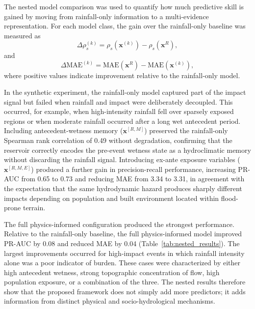 \documentclass[pdflatex,sn-mathphys-ay]{sn-jnl}
\theoremstyle{thmstyleone}
\theoremstyle{thmstylethree}
\theoremstyle{thmstyletwo}
\begin{document}
The nested model comparison was used to quantify how much predictive
skill is gained by moving from rainfall-only information to a
multi-evidence representation.  For each model class, the gain over the
rainfall-only baseline was measured as
\begin{equation}
  \Delta \rho_s^{(k)}
  =
  \rho_s
  \left(
    \mathbf{x}^{(k)}
  \right)
  -
  \rho_s
  \left(
    \mathbf{x}^{R}
  \right),
  \label{eq:delta_spearman}
\end{equation}
and
\begin{equation}
  \Delta \mathrm{MAE}^{(k)}
  =
  \mathrm{MAE}
  \left(
    \mathbf{x}^{R}
  \right)
  -
  \mathrm{MAE}
  \left(
    \mathbf{x}^{(k)}
  \right),
  \label{eq:delta_mae}
\end{equation}
where positive values indicate improvement relative to the
rainfall-only model.

In the synthetic experiment, the rainfall-only model captured part of
the impact signal but failed when rainfall and impact were deliberately
decoupled.  This occurred, for example, when high-intensity rainfall
fell over sparsely exposed regions or when moderate rainfall occurred
after a long wet antecedent period.  Including antecedent-wetness
memory ($\mathbf{x}^{[R,M]}$) preserved the rainfall-only Spearman
rank correlation of 0.49 without degradation, confirming that the
reservoir correctly encodes the pre-event wetness state as a
hydroclimatic memory without discarding the rainfall signal.
Introducing ex-ante exposure variables ($\mathbf{x}^{[R,M,E]}$)
produced a further gain in precision-recall performance, increasing
PR-AUC from 0.65 to 0.73 and reducing MAE from 3.34 to 3.31, in
agreement with the expectation that the same hydrodynamic hazard
produces sharply different impacts depending on population and
built environment located within flood-prone terrain.

The full physics-informed configuration produced the strongest
performance.  Relative to the rainfall-only baseline, the full
physics-informed model improved PR-AUC by 0.08 and reduced MAE by
0.04 (Table~\ref{tab:nested_results}).  The largest improvements
occurred for high-impact events in which rainfall intensity alone was a
poor indicator of burden.  These cases were characterized by either
high antecedent wetness, strong topographic concentration of flow, high
population exposure, or a combination of the three.  The nested results
therefore show that the proposed framework does not simply add more
predictors; it adds information from distinct physical and
socio-hydrological mechanisms.
\end{document}
